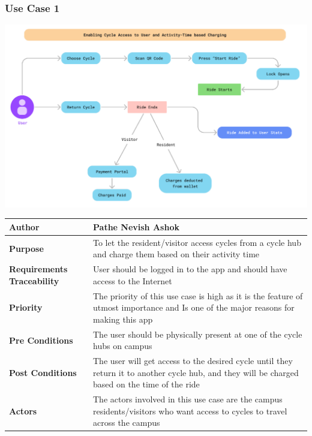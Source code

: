 \documentclass[11pt]{article}
\begin{document}
\subsubsection{Use Case 1}
\begin{center}
\includegraphics*[scale=0.6]{usecase-1.png}\\
\vspace{5mm}
\begin{tabular}{|l|p{10cm}|}
    \hline
    \textbf{Author} & Pathe Nevish Ashok \\
    \hline
    \textbf{Purpose} & To let the resident/visitor access cycles from a cycle hub and charge them based on their activity time \\
    \hline
    \textbf{Requirements Traceability} &User should be logged in to the app and should have access to the Internet \\
    \hline
    \textbf{Priority} &The priority of this use case is high as it is the feature of utmost  importance and Is one of the major reasons for making this app \\
    \hline
    \textbf{Pre Conditions} &The user should be physically present at one of the cycle hubs on campus \\
    \hline
    \textbf{Post Conditions} & The user will get access to the desired cycle until they return it to another cycle hub, and they will be charged based on the time of the ride\\
    \hline
    \textbf{Actors} & The actors involved in this use case are the campus residents/visitors who want access to cycles to travel across the campus\\
    \hline
\end{tabular}
\end{center}
\newpage
\end{document}
